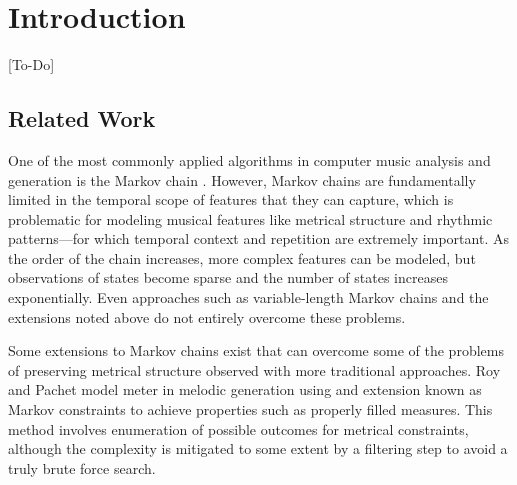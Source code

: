 \documentclass{article}
\title{\papertitle}
\begin{document}
%
\capstartfalse
\maketitle
\capstarttrue
%
\begin{abstract}
[Will need to be tweaked at the end to reflect any additions, but the original intro seems like a good fit here at the moment]

We present an approach for generating passages of rhythm via the use of a probabilistic temporal graph grammar with rule sets that operate via recursive subdivision. This project is motivated by three factors: (1) the recognition that the literature on computer-generated rhythm is generally not as robust as those for melody and harmony; (2) my desire as a composer of avant-garde classical music to have more tools for computer-assisted composition; and (3) the hope that such an approach, having already produced compelling results for some styles of music, may provide insight into the structure of rhythms found in existing repertoires.
\end{abstract}


\section{Introduction}\label{sec:introduction}

[To-Do]

\subsection{Related Work}

One of the most commonly applied algorithms in computer music analysis and generation is the Markov chain \cite{chordia2011, gillick2009, yi, pachet}. However, Markov chains are fundamentally limited in the temporal scope of features that they can capture, which is problematic for modeling musical features like metrical structure and rhythmic patterns---for which temporal context and repetition are extremely important. As the order of the chain increases, more complex features can be modeled, but observations of states become sparse and the number of states increases exponentially. Even approaches such as variable-length Markov chains \cite{ron, buhlmann} and the extensions noted above do not entirely overcome these problems.

Some extensions to Markov chains exist that can overcome some of the problems of preserving metrical structure observed with more traditional approaches. Roy and Pachet model meter in melodic generation \cite{roy2013} using and extension known as Markov constraints \cite{pachet2011} to achieve properties such as properly filled measures. This method involves enumeration of possible outcomes for metrical constraints, although the complexity is mitigated to some extent by a filtering step to avoid a truly brute force search.
\end{document}
